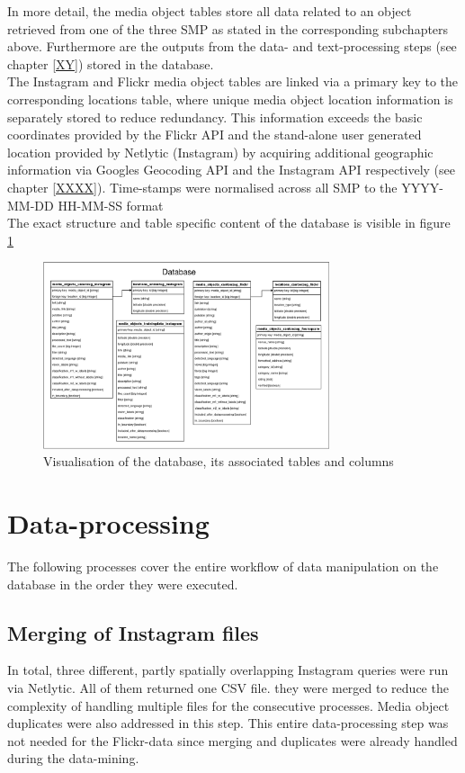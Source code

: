 In more detail, the media object tables store all data related to an object retrieved from one of the three SMP as stated in the corresponding subchapters above. Furthermore are the outputs from the data- and text-processing steps (see chapter \ref{XY}) stored in the database.\\ 
The Instagram and Flickr media object tables are linked via a primary key to the corresponding locations table, where unique media object location information is separately stored to reduce redundancy. This information exceeds the basic coordinates provided by the Flickr API and the stand-alone user generated location provided by Netlytic (Instagram) by acquiring additional geographic information via Googles Geocoding API and the Instagram API respectively (see chapter \ref{XXXX}). Time-stamps were normalised across all SMP to the YYYY-MM-DD HH-MM-SS format \\
\newline
The exact structure and table specific content of the database is visible in figure \ref{fig:database}

\begin{figure}[h]
   \centering
   \includegraphics[width=0.75\textwidth]{img/fusion_db_overview.eps}
   \caption{Visualisation of the database, its associated tables and columns}
   \label{fig:database}
\end{figure}

\section{Data-processing} \label{data_processing}
The following processes cover the entire workflow of data manipulation on the database in the order they were executed.
\subsection{Merging of Instagram files} \label{netlytic_files_merge}
In total, three different, partly spatially overlapping Instagram queries were run via Netlytic. All of them returned one CSV file. they were merged to reduce the complexity of handling multiple files for the consecutive processes. Media object duplicates were also addressed in this step. This entire data-processing step was not needed for the Flickr-data since merging and duplicates were already handled during the data-mining.

